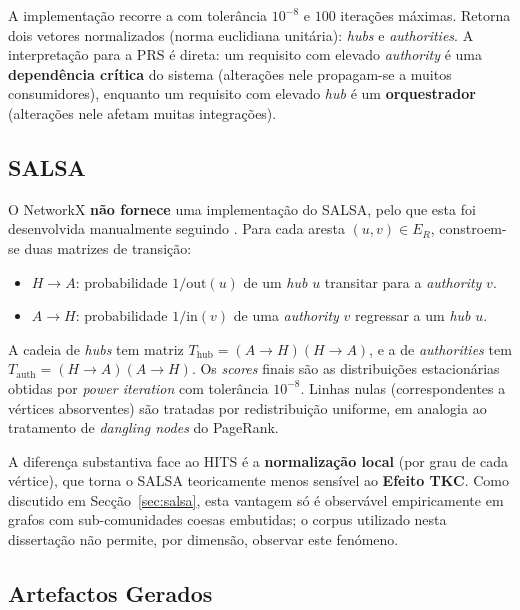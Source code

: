 A implementação recorre a  com tolerância $10^{-8}$ e
$100$ iterações máximas. Retorna dois vetores normalizados (norma
euclidiana unitária): \emph{hubs} e \emph{authorities}. A
interpretação para a PRS é direta: um requisito com elevado
\emph{authority} é uma \textbf{dependência crítica} do sistema
(alterações nele propagam-se a muitos consumidores), enquanto um
requisito com elevado \emph{hub} é um \textbf{orquestrador}
(alterações nele afetam muitas integrações).

\subsection{SALSA}
\label{sec:impl-salsa}

O NetworkX \textbf{não fornece} uma implementação do SALSA, pelo que
esta foi desenvolvida manualmente seguindo \citet{lempel2001}. Para
cada aresta $(u, v) \in E_R$, constroem-se duas matrizes de
transição:

\begin{itemize}
    \item $H \rightarrow A$: probabilidade $1/\text{out}(u)$ de um
        \emph{hub} $u$ transitar para a \emph{authority} $v$.
    \item $A \rightarrow H$: probabilidade $1/\text{in}(v)$ de uma
        \emph{authority} $v$ regressar a um \emph{hub} $u$.
\end{itemize}

A cadeia de \emph{hubs} tem matriz
$T_{\text{hub}} = (A \rightarrow H)(H \rightarrow A)$, e a de
\emph{authorities} tem
$T_{\text{auth}} = (H \rightarrow A)(A \rightarrow H)$. Os
\emph{scores} finais são as distribuições estacionárias obtidas por
\emph{power iteration} com tolerância $10^{-8}$. Linhas nulas
(correspondentes a vértices absorventes) são tratadas por
redistribuição uniforme, em analogia ao tratamento de
\emph{dangling nodes} do PageRank.

A diferença substantiva face ao HITS é a \textbf{normalização local}
(por grau de cada vértice), que torna o SALSA teoricamente menos
sensível ao \textbf{Efeito TKC}. Como discutido em
Secção~\ref{sec:salsa}, esta vantagem só é observável empiricamente
em grafos com sub-comunidades coesas embutidas; o corpus utilizado
nesta dissertação não permite, por dimensão, observar este fenómeno.

\subsection{Artefactos Gerados}
\label{sec:artefactos}

